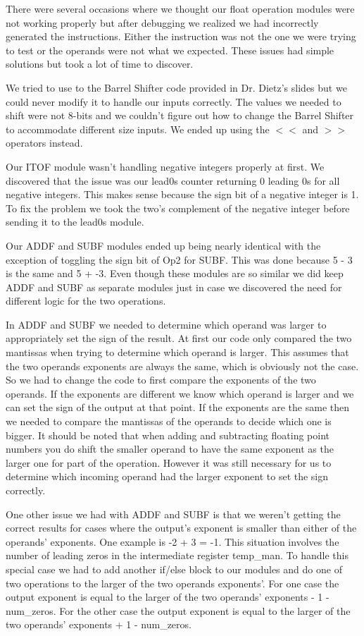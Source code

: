 \documentclass{article}
\begin{document}
\begin{multicols}{2}
There were several occasions where we thought our float operation modules were not working properly but after debugging we realized we had incorrectly generated the instructions. Either the instruction was not the one we were trying to test or the operands were not what we expected.  These issues had simple solutions but took a lot of time to discover.

We tried to use to the Barrel Shifter code provided in Dr. Dietz's slides but we could never modify it to handle our inputs correctly. The values we needed to shift were not 8-bits and we couldn't figure out how to change the Barrel Shifter to accommodate different size inputs. We ended up using the $<<$ and $>>$ operators instead.

Our ITOF module wasn't handling negative integers properly at first. We discovered that the issue was our lead0s counter returning 0 leading 0s for all negative integers. This makes sense because the sign bit of a negative integer is 1. To fix the problem we took the two's complement of the negative integer before sending it to the lead0s module.

Our ADDF and SUBF modules ended up being nearly identical with the exception of toggling the sign bit of Op2 for SUBF. This was done because 5 - 3 is the same and 5 + -3. Even though these modules are so similar we did keep ADDF and SUBF as separate modules just in case we discovered the need for different logic for the two operations.

In ADDF and SUBF we needed to determine which operand was larger to appropriately set the sign of the result. At first our code only compared the two mantissas when trying to determine which operand is larger. This assumes that the two operands exponents are always the same, which is obviously not the case. So we had to change the code to first compare the exponents of the two operands. If the exponents are different we know which operand is larger and we can set the sign of the output at that point. If the exponents are the same then we needed to compare the mantissas of the operands to decide which one is bigger. It should be noted that when adding and subtracting floating point numbers you do shift the smaller operand to have the same exponent as the larger one for part of the operation. However it was still necessary for us to determine which incoming operand had the larger exponent to set the sign correctly.

One other issue we had with ADDF and SUBF is that we weren't getting the correct results for cases where the output's exponent is smaller than either of the operands' exponents. One example is -2 + 3 = -1. This situation involves the number of leading zeros in the intermediate register temp\_man. To handle this special case we had to add another if/else block to our modules and do one of two operations to the larger of the two operands exponents'. For one case the output exponent is equal to the larger of the two operands' exponents - 1 - num\_zeros. For the other case the output exponent is equal to the larger of the two operands' exponents + 1 - num\_zeros.


\end{multicols}
\end{document}
